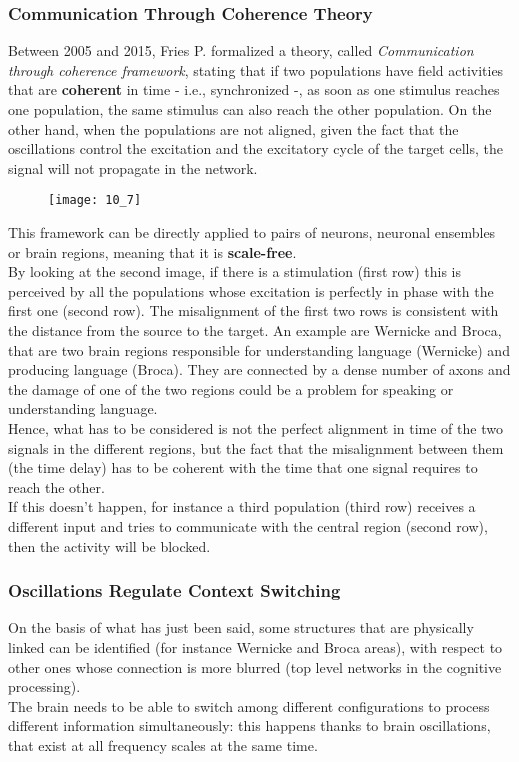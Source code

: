\subsubsection{Communication Through Coherence Theory}
Between 2005 and 2015, Fries P. formalized a theory, called \textit{Communication through
coherence framework}, stating that if two populations have field activities that are
\textbf{coherent} in time - i.e., synchronized -, as soon as one stimulus reaches one population,
the same stimulus can also reach the other population. On the other hand, when the populations
are not aligned, given the fact that the oscillations control the excitation and the
excitatory cycle of the target cells, the signal will not propagate in the network.
\begin{figure}[H]
    \texttt{[image: 10\_7]}
    \centering
\end{figure}
This framework can be directly applied to pairs of neurons, neuronal ensembles or brain
regions, meaning that it is \textbf{scale-free}.\\
By looking at the second image, if there is a stimulation (first row) this is perceived by
all the populations whose excitation is perfectly in phase with the first one (second row).
The misalignment of the first two rows is consistent with the distance from the source to the
target. An example are Wernicke and Broca, that are two brain regions responsible for
understanding language (Wernicke) and producing language (Broca). They are connected by a
dense number of axons and the damage of one of the two regions could be a problem for
speaking or understanding language.\\
Hence, what has to be considered is not the perfect alignment in time of the two signals in
the different regions, but the fact that the misalignment between them (the time delay) has
to be coherent with the time that one signal requires to reach the other.\\
If this doesn't happen, for instance a third population (third row) receives a different
input and tries to communicate with the central region (second row), then the activity will
be blocked.
\subsubsection{Oscillations Regulate Context Switching}
On the basis of what has just been said, some structures that are physically linked can be
identified (for instance Wernicke and Broca areas), with respect to other ones whose
connection is more blurred (top level networks in the cognitive processing).\\
The brain needs to be able to switch among different configurations to process different
information simultaneously: this happens thanks to brain oscillations, that exist at all
frequency scales at the same time.
